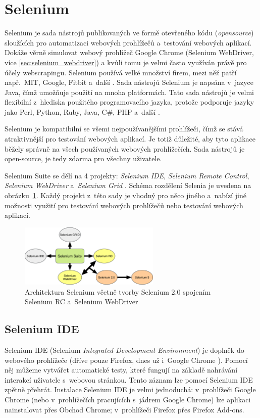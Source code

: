 \section{Selenium}
\label{sec:selenium}
Selenium je sada nástrojů publikovaných ve formě otevřeného kódu (\emph{opensource}) sloužících pro automatizaci webových prohlížečů a~testování webových aplikací. Dokáže věrně simulovat webový prohlížeč Google Chrome (Selenium WebDriver, více \ref{sec:selenium_webdriver}) a kvůli tomu je velmi často využíván právě pro účely webscrapingu. Selenium používá velké množství firem, mezi něž patří např.~MIT, Google, Fitbit a~další \cite{bib:selenium_automatizace}. Sada nástrojů Selenium je napsána v~jazyce Java, čímž umožňuje použití na mnoha platformách. Tato sada nástrojů je velmi flexibilní z~hlediska použitého programovacího jazyka, protože podporuje jazyky jako Perl, Python, Ruby, Java, C\#, PHP a~další \cite{bib:selenium_automatizace}.

Selenium je kompatibilní se všemi nejpoužívanějšími prohlížeči, čímž se stává atraktivnější pro testování webových aplikací. Je totiž důležité, aby tyto aplikace běžely správně na všech používaných webových prohlížečích. Sada nástrojů je open-source, je tedy zdarma pro všechny uživatele.

Selenium Suite se dělí na 4 projekty: \emph{Selenium IDE}, \emph{Selenium Remote Control}, \emph{Selenium WebDriver} a~\emph{Selenium Grid} \cite{bib:selenium_projekty}. Schéma rozdělení Selenia je uvedena na obrázku~\ref{img:selenium}. Každý projekt z~této sady je vhodný pro něco jiného a~nabízí jiné možnosti využití pro testování webových prohlížečů nebo testování webových aplikací. 

\begin{figure}[hbt]
	\centering
	\includegraphics[width=0.6\textwidth]{images/selenium.png}
	\caption{Architektura Selenium včetně tvorby Selenium 2.0 spojením Selenium RC a~Selenium WebDriver}
	\label{img:selenium}
\end{figure}

\subsection*{Selenium IDE}
Selenium IDE (Selenium \emph{Integrated Development Environment}) je doplněk do webového prohlížeče (dříve pouze Firefox, dnes už i~Google Chrome \cite{bib:selenium_chrome}). Pomocí něj můžeme vytvářet automatické testy, které fungují na základě nahrávání interakcí uživatele s~webovou stránkou. Tento záznam lze pomocí Selenium IDE zpětně přehrát. Instalace Selenium IDE je velmi jednoduchá: v~prohlížeči Google Chrome (nebo v~prohlížečích pracujících s~jádrem Google Chrome) lze aplikaci nainstalovat přes Obchod Chrome; v~prohlížeči Firefox přes Firefox Add-ons. 

